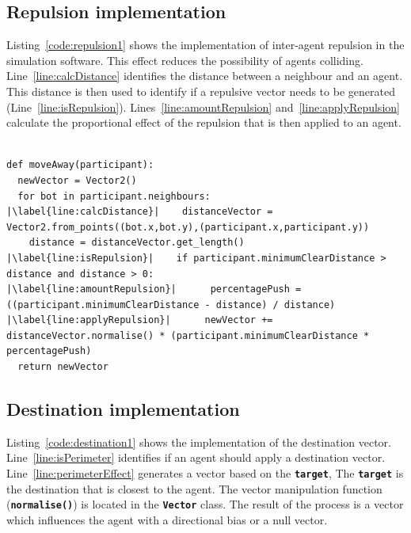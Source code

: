 \subsection{Repulsion implementation}
Listing~\ref{code:repulsion1} shows the implementation of inter-agent repulsion in the simulation software. This effect reduces the possibility of agents colliding. Line~\ref{line:calcDistance} identifies the distance between a neighbour and an agent. This distance is then used to identify if a repulsive vector needs to be generated (Line~\ref{line:isRepulsion}). Lines~\ref{line:amountRepulsion} and~\ref{line:applyRepulsion} calculate the proportional effect of the repulsion that is then applied to an agent.

\lstset{language=Python,
basicstyle=\tiny,
numbers=left, 
numberstyle=\tiny,
captionpos=b,
frame=single,
breaklines=true,
caption=Repulsion code,
escapechar=|
} %
\begin{lstlisting}[label={code:repulsion1}]  % Start your code-block

def moveAway(participant):
  newVector = Vector2()
  for bot in participant.neighbours:
|\label{line:calcDistance}|    distanceVector = Vector2.from_points((bot.x,bot.y),(participant.x,participant.y))
    distance = distanceVector.get_length()
|\label{line:isRepulsion}|    if participant.minimumClearDistance > distance and distance > 0:
|\label{line:amountRepulsion}|      percentagePush = ((participant.minimumClearDistance - distance) / distance)
|\label{line:applyRepulsion}|      newVector += distanceVector.normalise() * (participant.minimumClearDistance * percentagePush)
  return newVector
\end{lstlisting}

\subsection{Destination implementation}
Listing~\ref{code:destination1} shows the implementation of the destination vector. Line~\ref{line:isPerimeter} identifies if an agent should apply a destination vector. Line~\ref{line:perimeterEffect} generates a vector based on the \texttt{\textbf{target}}, The \texttt{\textbf{target}} is the destination that is closest to the agent. The vector manipulation function (\texttt{\textbf{normalise()}}) is located in the \texttt{\textbf{Vector}} class. The result of the process is a vector which influences the agent with a directional bias or a null vector.

